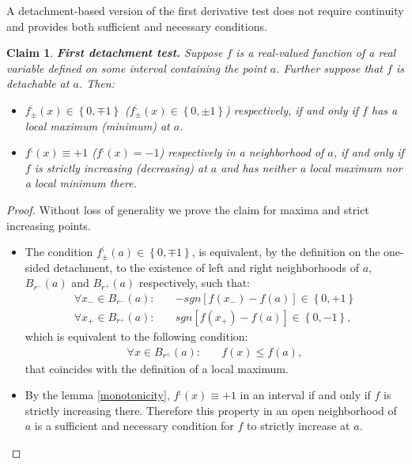 \documentclass[11pt]{book}
\newtheorem{clm}[thm]{Claim}
\begin{document}
A detachment-based version of the first derivative test does not require
continuity and provides both sufficient and necessary conditions.
\begin{clm}\textbf{First detachment test. }Suppose $f$ is a real-valued function
of a real variable defined on some interval containing the point $a$.
Further suppose that $f$ is detachable at $a$. Then:
\begin{itemize}
\item $f_{\pm}^{;}\left(x\right)\in\left\{ 0,\mp1\right\} $ ($f_{\pm}^{;}\left(x\right)\in\left\{ 0,\pm1\right\} $)
respectively, if and only if $f$ has a local maximum (minimum) at
$a$.
\item $f^{;}\left(x\right)\equiv+1$ ($f^{;}\left(x\right)=-1$) respectively
in a neighborhood of $a$, if and only if $f$ is strictly increasing
(decreasing) at $a$ and has neither a local maximum nor a local minimum
there.
\end{itemize}
\label{first_detachment_test}
\end{clm}
\begin{proof}Without loss of generality we prove the claim for maxima and
strict increasing points.
\begin{itemize}
\item The condition $f_{\pm}^{;}\left(a\right)\in\left\{ 0,\mp1\right\} $,
is equivalent, by the definition on the one-sided detachment, to the
existence of left and right neighborhoods of $a$, $B_{r^{-}}\left(a\right)$
and $B_{r^{+}}\left(a\right)$ respectively, such that:
\begin{align*}
\forall x_{-}\in B_{r^{-}}\left(a\right):\quad & -sgn\left[f\left(x_{-}\right)-f\left(a\right)\right]\in\left\{ 0,+1\right\} \\
\forall x_{+}\in B_{r^{+}}\left(a\right):\quad & sgn\left[f\left(x_{+}\right)-f\left(a\right)\right]\in\left\{ 0,-1\right\} ,
\end{align*}
which is equivalent to the following condition:
\begin{align*}
\forall x\in B_{r^{\pm}}\left(a\right):\quad & f\left(x\right)\leq f\left(a\right),
\end{align*}
that coincides with the definition of a local maximum.
\item By the lemma \ref{monotonicity}, $f^{;}\left(x\right)\equiv+1$ in an interval if
and only if $f$ is strictly increasing there. Therefore this property
in an open neighborhood of $a$ is a sufficient and necessary condition
for $f$ to strictly increase at $a$.
\end{itemize}
\end{proof}
\end{document}
